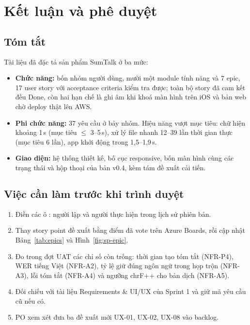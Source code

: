 \documentclass[12pt,a4paper]{report}
\begin{document}
\chapter{Kết luận và phê duyệt}
\label{chap:conclusion}

\section{Tóm tắt}

Tài liệu đã đặc tả sản phẩm SumTalk ở ba mức:
\begin{itemize}
  \item \textbf{Chức năng:} bốn nhóm người dùng, mười một module tính năng và 7 epic, 17 user story với acceptance
        criteria kiểm tra được; toàn bộ story đã cam kết đều Done, còn hai hạn chế là ghi âm khi khoá màn hình trên
        iOS và bản web chờ deploy thật lên AWS.
  \item \textbf{Phi chức năng:} 37 yêu cầu ở bảy nhóm. Hiệu năng vượt mục tiêu: chữ hiện khoảng 1\,s (mục tiêu
        $\leq$ 3--5\,s), xử lý file nhanh 12--39 lần thời gian thực (mục tiêu 6 lần), app khởi động trong 1,5--1,9\,s.
  \item \textbf{Giao diện:} hệ thống thiết kế, bố cục responsive, bốn màn hình cùng các trạng thái và hộp thoại của
        bản v0.4, kèm tám đề xuất cải tiến.
\end{itemize}

\section{Việc cần làm trước khi trình duyệt}

\begin{enumerate}
  \item Điền các ô \canDien: người lập và người thực hiện trong lịch sử phiên bản.
  \item Thay story point đề xuất bằng điểm đã vote trên Azure Boards, rồi cập nhật Bảng~\ref{tab:epics} và
        Hình~\ref{fig:sp-epic}.
  \item Đo trong đợt UAT các chỉ số còn trống: thời gian tạo tóm tắt (NFR-P4), WER tiếng Việt (NFR-A2), tỷ lệ giữ
        đúng ngôn ngữ trong họp trộn (NFR-A3), lỗi tóm tắt (NFR-A4) và ngưỡng chrF++ cho bản dịch (NFR-A5).
  \item Đối chiếu với tài liệu Requirements \& UI/UX của Sprint 1 và giữ mã yêu cầu cũ nếu có.
  \item PO xem xét đưa ba đề xuất mới UX-01, UX-02, UX-08 vào backlog.
\end{enumerate}
\end{document}

